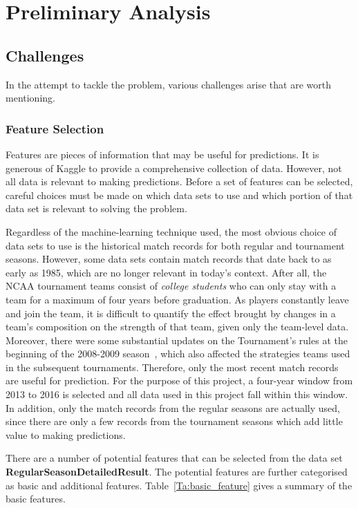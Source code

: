 \chapter{Preliminary Analysis}\label{Chap:2}

\section{Challenges}

In the attempt to tackle the problem, various challenges arise that are worth mentioning.

\subsection{Feature Selection}

Features are pieces of information that may be useful for predictions. It is generous of Kaggle to provide a comprehensive collection of data. However, not all data is relevant to making predictions. Before a set of features can be selected, careful choices must be made on which data sets to use and which portion of that data set is relevant to solving the problem. 

Regardless of the machine-learning technique used, the most obvious choice of data sets to use is the historical match records for both regular and tournament seasons. However, some data sets contain match records that date back to as early as 1985, which are no longer relevant in today's context. After all, the NCAA tournament teams consist of \emph{college students} who can only stay with a team for a maximum of four years before graduation. As players constantly leave and join the team, it is difficult to quantify the effect brought by changes in a team's composition on the strength of that team, given only the team-level data. Moreover, there were some substantial updates on the Tournament's rules at the beginning of the 2008-2009 season~\cite{NP15}, which also affected the strategies teams used in the subsequent tournaments. Therefore, only the most recent match records are useful for prediction. For the purpose of this project, a four-year window from 2013 to 2016 is selected and all data used in this project fall within this window. In addition, only the match records from the regular seasons are actually used, since there are only a few records from the tournament seasons which add little value to making predictions. 

There are a number of potential features that can be selected from the data set \textbf{RegularSeasonDetailedResult}. The potential features are further categorised as basic and additional features. Table~\ref{Ta:basic_feature} gives a summary of the basic features. 

